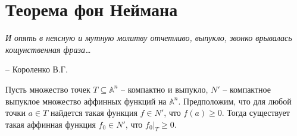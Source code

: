 \chapter{Теорема фон Неймана}
\label{cha:6}

\epigraph{
	\textit{И опять в неясную и мутную молитву отчетливо, выпукло, звонко врывалась кощунственная фраза…}}
{-- Короленко В.Г.}

\begin{propose}\label{cha:6/propose:1}
	Пусть множество точек $T \subseteq \mathbb{A}^n$ – компактно и выпукло, $N'$ – компактное выпуклое множество аффинных функций на $\mathbb{A}^n$. Предположим, что для любой точки $a \in T$ найдется такая функция $f \in N'$, что $f(a) \ge 0$. Тогда существует такая аффинная функция $f_0 \in N'$, что $f_0 |_T \ge 0$.
\end{propose}
